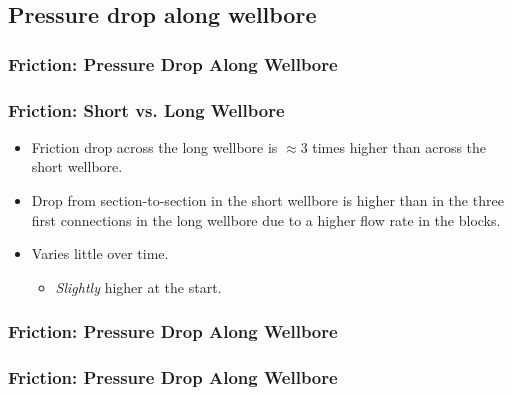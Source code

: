 \subsection{Pressure drop along wellbore}
\begin{frame}
    \frametitle{Friction: Pressure Drop Along Wellbore}
    \centerline{}
\end{frame}

\begin{frame}
    \frametitle{Friction: Short vs. Long Wellbore}
    \begin{itemize}
        \item Friction drop across the long wellbore is $\approx 3$ times higher than across the short wellbore.
        \pause
        \item Drop from section-to-section in the short wellbore is higher than in the three first connections in the long wellbore due to a higher flow rate in the blocks.
        \pause
        \item Varies little over time.
        \begin{itemize}
            \item \emph{Slightly} higher at the start.
        \end{itemize}
    \end{itemize}
\end{frame}

\begin{frame}
    \frametitle{Friction: Pressure Drop Along Wellbore}
    \centerline{}
\end{frame}

\begin{frame}
    \frametitle{Friction: Pressure Drop Along Wellbore}
    \centerline{}
\end{frame}

